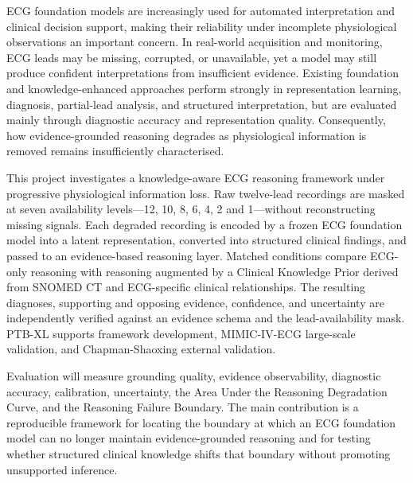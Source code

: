 \documentclass{ssnreview}
\begin{document}
\makereviewtitle
\reviewfrontmatter

\begin{reviewabstract}
ECG foundation models are increasingly used for automated interpretation and clinical
decision support, making their reliability under incomplete physiological observations an
important concern. In real-world acquisition and monitoring, ECG leads may be missing,
corrupted, or unavailable, yet a model may still produce confident interpretations from
insufficient evidence. Existing foundation and knowledge-enhanced approaches perform
strongly in representation learning, diagnosis, partial-lead analysis, and structured
interpretation, but are evaluated mainly through diagnostic accuracy and representation
quality. Consequently, how evidence-grounded reasoning degrades as physiological
information is removed remains insufficiently characterised.

This project investigates a knowledge-aware ECG reasoning framework under progressive
physiological information loss. Raw twelve-lead recordings are masked at seven availability
levels---12, 10, 8, 6, 4, 2 and 1---without reconstructing missing signals. Each degraded
recording is encoded by a frozen ECG foundation model into a latent representation,
converted into structured clinical findings, and passed to an evidence-based reasoning layer.
Matched conditions compare ECG-only reasoning with reasoning augmented by a Clinical
Knowledge Prior derived from SNOMED CT and ECG-specific clinical relationships.
The resulting diagnoses, supporting and opposing evidence, confidence, and uncertainty
are independently verified against an evidence schema and the lead-availability mask.
PTB-XL supports framework development, MIMIC-IV-ECG large-scale validation, and
Chapman-Shaoxing external validation.

Evaluation will measure grounding quality, evidence observability, diagnostic accuracy,
calibration, uncertainty, the Area Under the Reasoning Degradation Curve, and the
Reasoning Failure Boundary. The main contribution is a reproducible framework for
locating the boundary at which an ECG foundation model can no longer maintain
evidence-grounded reasoning and for testing whether structured clinical knowledge shifts that
boundary without promoting unsupported inference.

\end{reviewabstract}
\end{document}
